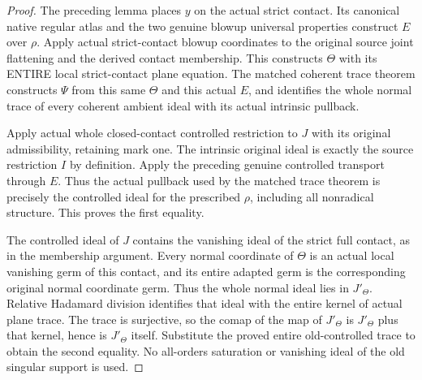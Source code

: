 \begin{proof}
The preceding lemma places $y$ on the actual strict contact. Its canonical
native regular atlas and the two genuine blowup universal properties construct
$E$ over $\rho$. Apply actual strict-contact blowup coordinates to the original
source joint flattening and the derived contact membership. This constructs
$\Theta$ with its ENTIRE local strict-contact plane equation. The matched
coherent trace theorem constructs $\Psi$ from this same $\Theta$ and this
actual $E$, and identifies the whole normal trace of every coherent ambient
ideal with its actual intrinsic pullback.

Apply actual whole closed-contact controlled restriction to $J$ with its
original admissibility, retaining mark one. The intrinsic original ideal is
exactly the source restriction $I$ by definition. Apply the preceding genuine
controlled transport through $E$. Thus the actual pullback used by the matched
trace theorem is precisely the controlled ideal for the prescribed $\rho$,
including all nonradical structure. This proves the first equality.

The controlled ideal of $J$ contains the vanishing ideal of the strict full
contact, as in the membership argument. Every normal coordinate of $\Theta$
is an actual local vanishing germ of this contact, and its entire adapted
germ is the corresponding original normal coordinate germ. Thus the whole
normal ideal lies in $J'_\Theta$. Relative Hadamard division identifies that
ideal with the entire kernel of actual plane trace. The trace is surjective,
so the comap of the map of $J'_\Theta$ is $J'_\Theta$ plus that kernel, hence
is $J'_\Theta$ itself. Substitute the proved entire old-controlled trace to
obtain the second equality. No all-orders saturation or vanishing ideal of
the old singular support is used.
\end{proof}
